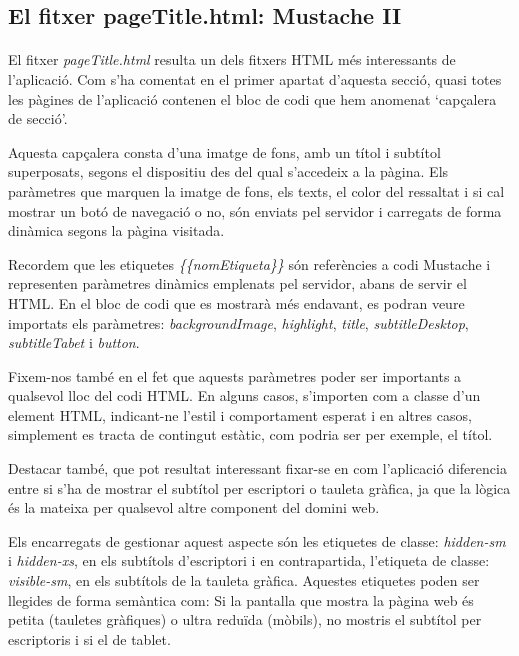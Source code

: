 \subsection{El fitxer pageTitle.html: Mustache II}

    \paragraph{}
    El fitxer \emph{pageTitle.html} resulta un dels fitxers HTML més interessants de l'aplicació. Com s'ha comentat en el primer apartat d'aquesta secció, quasi totes les pàgines de l'aplicació contenen el bloc de codi que hem anomenat `capçalera de secció'.

    Aquesta capçalera consta d'una imatge de fons, amb un títol i subtítol superposats, segons el dispositiu des del qual s'accedeix a la pàgina. Els paràmetres que marquen la imatge de fons, els texts, el color del ressaltat i si cal mostrar un botó de navegació o no, són enviats pel servidor i carregats de forma dinàmica segons la pàgina visitada.

    Recordem que les etiquetes \emph{\{\{nomEtiqueta\}\}} són referències a codi Mustache i representen paràmetres dinàmics emplenats pel servidor, abans de servir el HTML. En el bloc de codi que es mostrarà més endavant, es podran veure importats els paràmetres: \emph{backgroundImage}, \emph{highlight}, \emph{title}, \emph{subtitleDesktop}, \emph{subtitleTabet} i \emph{button}.

    Fixem-nos també en el fet que aquests paràmetres poder ser importants a qualsevol lloc del codi HTML. En alguns casos, s'importen com a classe d'un element HTML, indicant-ne l'estil i comportament esperat i en altres casos, simplement es tracta de contingut estàtic, com podria ser per exemple, el títol.

    Destacar també, que pot resultat interessant fixar-se en com l'aplicació diferencia entre si s'ha de mostrar el subtítol per escriptori o tauleta gràfica, ja que la lògica és la mateixa per qualsevol altre component del domini web.

    Els encarregats de gestionar aquest aspecte són les etiquetes de classe: \emph{hidden-sm} i \emph{hidden-xs}, en els subtítols d'escriptori i en contrapartida, l'etiqueta de classe: \emph{visible-sm}, en els subtítols de la tauleta gràfica. Aquestes etiquetes poden ser llegides de forma semàntica com: Si la pantalla que mostra la pàgina web és petita (tauletes gràfiques) o ultra reduïda (mòbils), no mostris el subtítol per escriptoris i si el de tablet.

